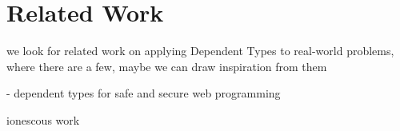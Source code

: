 \section{Related Work}
\label{sec:related_work}
we look for related work on applying Dependent Types to real-world problems, where there are a few, maybe we can draw inspiration from them

- dependent types for safe and secure web programming

ionescous work
\cite{ionescu_dependently-typed_2012}
\cite{botta_functional_2011}
